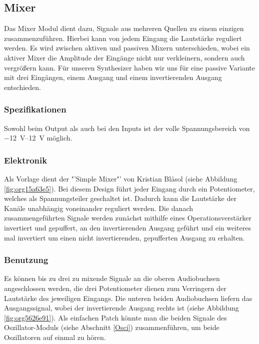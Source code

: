 \newpage

\newpage
\subsection{Mixer \label{Mixer}}
\label{sec:org17dbae1}
Das Mixer Modul dient dazu, Signale aus mehreren Quellen zu einem einzigen zusammenzuführen. Hierbei kann von jedem Eingang die Lautstärke reguliert werden. Es wird zwischen aktiven und passiven Mixern unterschieden, wobei ein aktiver Mixer die Amplitude der Eingänge nicht nur verkleinern, sondern auch vergrößern kann. Für unseren Synthesizer haben wir uns für eine passive Variante mit drei Eingängen, einem Ausgang und einem invertierenden Ausgang entschieden.

\subsubsection{Spezifikationen}
\label{sec:orgc5847ec}
Sowohl beim Output als auch bei den Inputs ist der volle Spannungsbereich von \SIrange{-12}{+12}{\volt} möglich.

\subsubsection{Elektronik}
\label{sec:orge72d196}
Als Vorlage dient der "'Simple Mixer"' von Kristian Blåsol \cite{miaw:mixer} (siehe Abbildung \ref{fig:org15a63e5}). Bei diesem Design führt jeder Eingang durch ein Potentiometer, welches als Spannungsteiler geschaltet ist. Dadurch kann die Lautstärke der Kanäle unabhängig voneinander reguliert werden. Die danach zusammengeführten Signale werden zunächst mithilfe eines Operationsverstärker invertiert und gepuffert, an den invertierenden Ausgang geführt und ein weiteres mal invertiert um einen nicht invertierenden, gepufferten Ausgang zu erhalten.

\newpage

\subsubsection{Benutzung}
\label{sec:org755be4b}
Es können bis zu drei zu mixende Signale an die oberen Audiobuchsen angeschlossen werden, die drei Potentiometer dienen zum Verringern der Lautstärke des jeweiligen Eingangs. Die unteren beiden Audiobuchsen liefern das Ausgangssignal, wobei der invertierende Ausgang rechts ist (siehe Abbildung \ref{fig:org5626e91}). Als einfachen Patch könnte man die beiden Signale des Oszillator-Moduls (siehe Abschnitt \ref{Osci}) zusammenführen, um beide Oszillatoren auf einmal zu hören.

